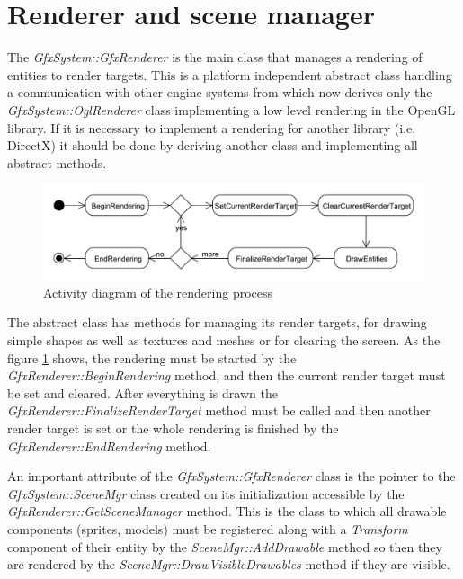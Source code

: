 \documentclass[a4paper, 12pt]{report}
\begin{document}
\section{Renderer and scene manager}

The \emph{GfxSystem::GfxRenderer} is the main class that manages a rendering of entities to render targets. This is a platform independent abstract class handling a communication with other engine systems from which now derives only the \emph{GfxSystem::OglRenderer} class implementing a low level rendering in the OpenGL library\cite{opengl}. If it is necessary to implement a rendering for another library (i.e. DirectX) it should be done by deriving another class and implementing all abstract methods.

\begin{figure}[htbp]
	\centering
		\includegraphics[width=1\textwidth]{RenderingActivityDiagram.pdf}
	\caption{Activity diagram of the rendering process}
	\label{fig:rendering-diagram}
\end{figure}

The abstract class has methods for managing its render targets, for drawing simple shapes as well as textures and meshes or for clearing the screen. As the figure \ref{fig:rendering-diagram} shows, the rendering must be started by the \emph{GfxRenderer::BeginRendering} method, and then the current render target must be set and cleared. After everything is drawn the \emph{GfxRenderer\-::Finalize\-Render\-Target} method must be called and then another render target is set or the whole rendering is finished by the \emph{GfxRenderer::EndRendering} method.

An important attribute of the \emph{GfxSystem::GfxRenderer} class is the point\-er to the \emph{GfxSystem::SceneMgr} class created on its initialization accessible by the \emph{GfxRenderer::GetSceneManager} method. This is the class to which all drawable components (sprites, models) must be registered along with a \emph{Transform} component of their entity by the \emph{SceneMgr::AddDrawable} method so then they are rendered by the \emph{SceneMgr::DrawVisibleDrawables} method if they are visible.
\end{document}
